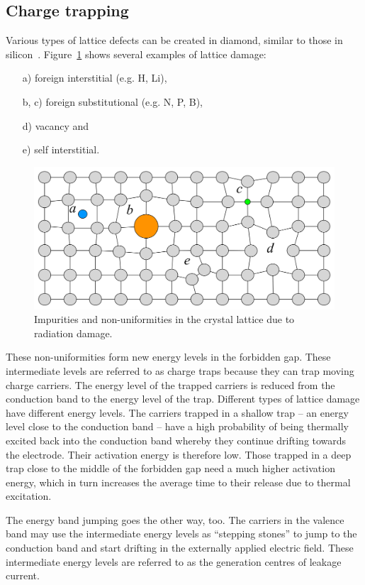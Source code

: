 \subsection{Charge trapping}
Various types of lattice defects can be created in diamond, similar to those in silicon~\cite{CHTR:00000}.
Figure~\ref{fig:raddamage} shows several examples of lattice damage:
\begin{enumerate}
\item[a)]foreign interstitial (e.g. H, Li),
\item[b, c)]foreign substitutional (e.g. N, P, B),
\item[d)]vacancy and
\item[e)]self interstitial.
\end{enumerate}
\begin{figure}[!t]
\begin{center}
\includegraphics[width=0.55\linewidth]{02_pulse_formation/pics/plots/raddamage}
\caption{Impurities and non-uniformities in the crystal lattice due to radiation damage.}
\label{fig:raddamage}
\end{center}
\end{figure} 
These non-uniformities form new energy levels in the forbidden gap. These intermediate levels are referred to as charge traps because they can trap moving charge carriers. The energy level of the trapped carriers is reduced from the conduction band to the energy level of the trap. Different types of lattice damage have different energy levels. The carriers trapped in a shallow trap -- an energy level close to the conduction band -- have a high probability of being thermally excited back into the conduction band whereby they continue drifting towards the electrode. Their activation energy is therefore low. Those trapped in a deep trap close to the middle of the forbidden gap need a much higher activation energy, which in turn increases the average time to their release due to thermal excitation.

The energy band jumping goes the other way, too. The carriers in the valence band may use the intermediate energy levels as ``stepping stones'' to jump to the conduction band and start drifting in the externally applied electric field. These intermediate energy levels are referred to as the generation centres of leakage current.

